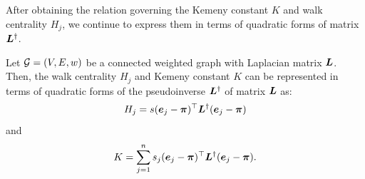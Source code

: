 \documentclass[journal]{IEEEtran}
\begin{document}
After obtaining the relation governing  the Kemeny constant \(K\)  and walk centrality \(H_j\), we continue to express them in terms of quadratic forms of matrix  \(\boldsymbol{L}^{\dagger}\).

\begin{lemma}
    \label{HjK} Let \(\mathcal{G}=(V,E,w)\) be a connected weighted graph  with  Laplacian matrix \(\boldsymbol{L}\). Then, the walk centrality \(H_j\) and Kemeny constant \(K\) can be represented  in terms of quadratic forms of the pseudoinverse \(\boldsymbol{L}^{\dagger}\)  of   matrix  \(\boldsymbol{L}\) as:
    \begin{equation}\label{ATT02}
        H_j=s(\boldsymbol{e}_j - \boldsymbol{\pi})^{\top} \boldsymbol{L}^{\dagger} (\boldsymbol{e}_j - \boldsymbol{\pi})
    \end{equation}
    and
    \begin{equation}\label{Kemeny03}
        K= \sum_{j=1}^{n} s_j (\boldsymbol{e}_j - \boldsymbol{\pi})^{\top} \boldsymbol{L}^{\dagger} (\boldsymbol{e}_j - \boldsymbol{\pi}).
    \end{equation}
\end{lemma}
\end{document}
